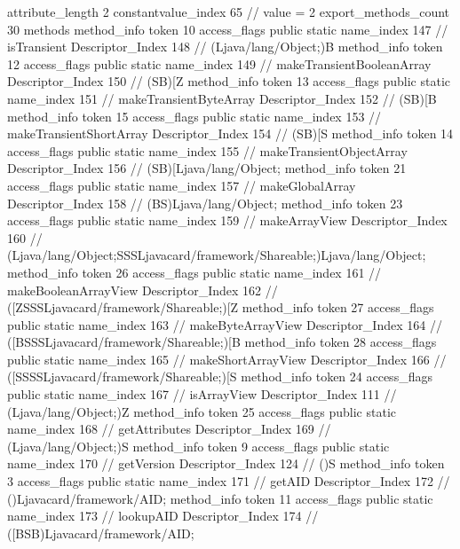{{{{{{{					attribute_length	2
					constantvalue_index	65		// value = 2
				}
				}
			}
			}
			export_methods_count	30
			methods {
				method_info {
					token	10
					access_flags	public static
					name_index	147		// isTransient
					Descriptor_Index	148		// (Ljava/lang/Object;)B
				}
				method_info {
					token	12
					access_flags	public static
					name_index	149		// makeTransientBooleanArray
					Descriptor_Index	150		// (SB)[Z
				}
				method_info {
					token	13
					access_flags	public static
					name_index	151		// makeTransientByteArray
					Descriptor_Index	152		// (SB)[B
				}
				method_info {
					token	15
					access_flags	public static
					name_index	153		// makeTransientShortArray
					Descriptor_Index	154		// (SB)[S
				}
				method_info {
					token	14
					access_flags	public static
					name_index	155		// makeTransientObjectArray
					Descriptor_Index	156		// (SB)[Ljava/lang/Object;
				}
				method_info {
					token	21
					access_flags	public static
					name_index	157		// makeGlobalArray
					Descriptor_Index	158		// (BS)Ljava/lang/Object;
				}
				method_info {
					token	23
					access_flags	public static
					name_index	159		// makeArrayView
					Descriptor_Index	160		// (Ljava/lang/Object;SSSLjavacard/framework/Shareable;)Ljava/lang/Object;
				}
				method_info {
					token	26
					access_flags	public static
					name_index	161		// makeBooleanArrayView
					Descriptor_Index	162		// ([ZSSSLjavacard/framework/Shareable;)[Z
				}
				method_info {
					token	27
					access_flags	public static
					name_index	163		// makeByteArrayView
					Descriptor_Index	164		// ([BSSSLjavacard/framework/Shareable;)[B
				}
				method_info {
					token	28
					access_flags	public static
					name_index	165		// makeShortArrayView
					Descriptor_Index	166		// ([SSSSLjavacard/framework/Shareable;)[S
				}
				method_info {
					token	24
					access_flags	public static
					name_index	167		// isArrayView
					Descriptor_Index	111		// (Ljava/lang/Object;)Z
				}
				method_info {
					token	25
					access_flags	public static
					name_index	168		// getAttributes
					Descriptor_Index	169		// (Ljava/lang/Object;)S
				}
				method_info {
					token	9
					access_flags	public static
					name_index	170		// getVersion
					Descriptor_Index	124		// ()S
				}
				method_info {
					token	3
					access_flags	public static
					name_index	171		// getAID
					Descriptor_Index	172		// ()Ljavacard/framework/AID;
				}
				method_info {
					token	11
					access_flags	public static
					name_index	173		// lookupAID
					Descriptor_Index	174		// ([BSB)Ljavacard/framework/AID;
}}}}}
